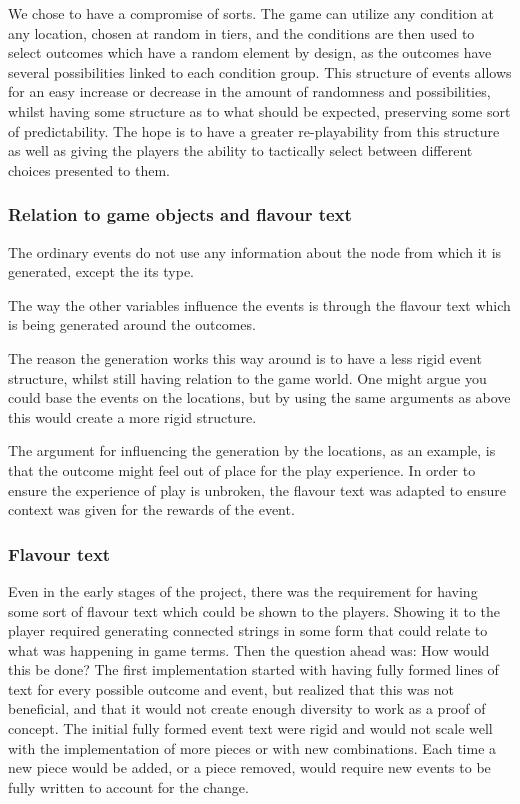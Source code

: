 We chose to have a compromise of sorts. The game can utilize any condition at any location, chosen at random in tiers, and the conditions are then used to select outcomes which have a random element by design, as the outcomes have several possibilities linked to each condition group.
This structure of events allows for an easy increase or decrease in the amount of randomness and possibilities, whilst having some structure as to what should be expected, preserving some sort of predictability. The hope is to have a greater re-playability from this structure as well as giving the players the ability to tactically select between different choices presented to them.

\subsubsection{Relation to game objects and flavour text}
The ordinary events do not use any information about the node from which it is generated, except the its type. 

The way the other variables influence the events is through the flavour text which is being generated around the outcomes. 

The reason the generation works this way around is to have a less rigid event structure, whilst still having relation to the game world.
One might argue you could base the events on the locations, but by using the same arguments as above this would create a more rigid structure. 

The argument for influencing the generation by the locations, as an example, is that the outcome might feel out of place for the play experience. In order to ensure the experience of play is unbroken, the flavour text was adapted to ensure context was given for the rewards of the event.

\subsubsection{Flavour text}
Even in the early stages of the project, there was the requirement for having some sort of flavour text which could be shown to the players. Showing it to the player required generating connected strings in some form that could relate to what was happening in game terms.
Then the question ahead was: How would this be done?
The first implementation started with having fully formed lines of text for every possible outcome and event, but realized that this was not beneficial, and that it would not create enough diversity to work as a proof of concept. 
The initial fully formed event text were rigid and would not scale well with the implementation of more pieces or with new combinations. Each time a new piece would be added, or a piece removed, would require new events to be fully written to account for the change. 

